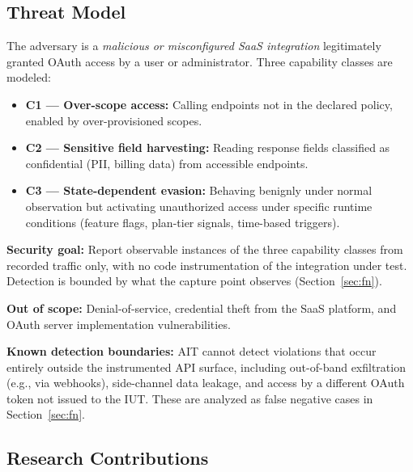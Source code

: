 \documentclass[conference]{IEEEtran}
\begin{document}
\subsection{Threat Model}
\label{sec:threat}

The adversary is a \emph{malicious or misconfigured SaaS integration}
legitimately granted OAuth access by a user or administrator. Three
capability classes are modeled:

\begin{itemize}
  \item \textbf{C1 --- Over-scope access:} Calling endpoints not in the
        declared policy, enabled by over-provisioned scopes.
  \item \textbf{C2 --- Sensitive field harvesting:} Reading response
        fields classified as confidential (PII, billing data) from
        accessible endpoints.
  \item \textbf{C3 --- State-dependent evasion:} Behaving benignly
        under normal observation but activating unauthorized access
        under specific runtime conditions (feature flags, plan-tier
        signals, time-based triggers).
\end{itemize}

\noindent\textbf{Security goal:} Report observable instances of the three
capability classes from recorded traffic only, with no code
instrumentation of the integration under test. Detection is bounded by
what the capture point observes (Section~\ref{sec:fn}).

\noindent\textbf{Out of scope:} Denial-of-service, credential theft
from the SaaS platform, and OAuth server implementation vulnerabilities.

\noindent\textbf{Known detection boundaries:} AIT cannot detect
violations that occur entirely outside the instrumented API surface,
including out-of-band exfiltration (e.g., via webhooks), side-channel
data leakage, and access by a different OAuth token not issued to the
IUT. These are analyzed as false negative cases in
Section~\ref{sec:fn}.

\subsection{Research Contributions}
\end{document}
